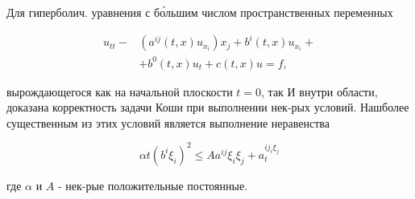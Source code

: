 \documentclass[10pt]{article}
\begin{document}
Для гиперболич. уравнения с бо́льшим числом пространственных переменных



\[

\begin{aligned}

u_{t t}- & \left(a^{i j}(t, x) u_{x_{i}}\right) x_{j}+b^{i}(t, x) u_{x_{i}}+ \\

& +b^{0}(t, x) u_{t}+c(t, x) u=f,

\end{aligned}

\]



вырождающегося как на начальной плоскости $t=0$, так И внутри области, доказана корректность задачи Коши при выполнении нек-рых условий. Нашболее существенным из этих условий является выполнение неравенства



\[

\alpha t\left(b^{i} \xi_{i}\right)^{2} \leqslant A a^{i j} \xi_{i} \xi_{j}+a_{t}^{i j_{i} \xi_{j}}

\]



где $\alpha$ и $A$ - нек-рые положительные постоянные.
\end{document}
